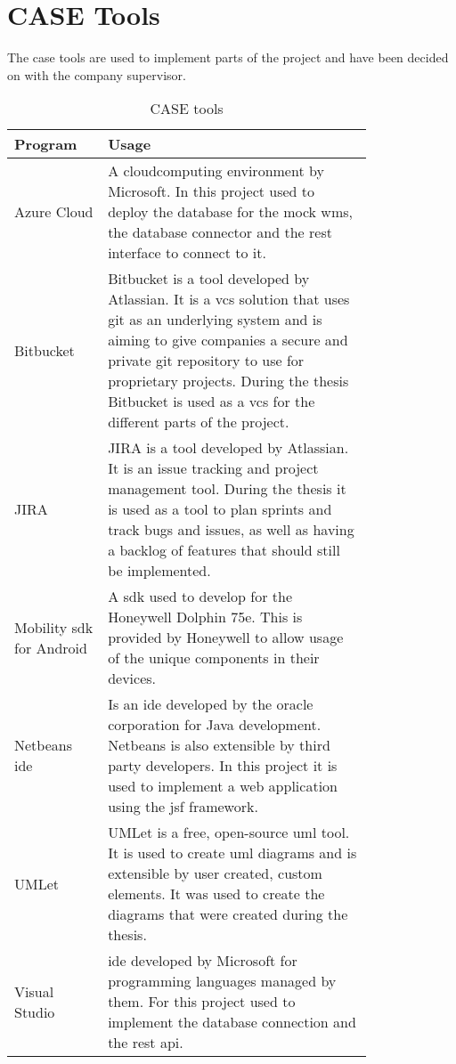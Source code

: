 \clearpage

\section{CASE Tools}\label{sec:caseTools}
The \gls{case} tools are used to implement parts of the project and have been decided on with the company supervisor. 

\begin{table}[htbp]
	\begin{center}
	\begin{tabular}{|p{0.2\linewidth}|p{0.6\linewidth}|} \hline
	\textbf{Program} & \textbf{Usage} \\ \hline
	Azure Cloud & A \gls{cloudcomputing} environment by Microsoft. In this project used to deploy the database for the mock \gls{wms}, the database connector and the \gls{rest} interface to connect to it. \\ \hline
	Bitbucket & Bitbucket is a tool developed by Atlassian. It is a \gls{vcs} solution that uses git as an underlying system and is aiming to give companies a secure and private git repository to use for proprietary projects. During the thesis Bitbucket is used as a \gls{vcs} for the different parts of the project. \\ \hline
	JIRA & JIRA is a tool developed by Atlassian. It is an issue tracking and project management tool. During the thesis it is used as a tool to plan sprints and track bugs and issues, as well as having a backlog of features that should still be implemented. \\ \hline
	Mobility \gls{sdk} for Android & A \gls{sdk} used to develop for the Honeywell Dolphin 75e. This is provided by Honeywell to allow usage of the unique components in their devices.\\ \hline
	Netbeans \gls{ide} & Is an \gls{ide} developed by the oracle corporation for Java development. Netbeans is also extensible by third party developers. In this project it is used to implement a web application using the \gls{jsf} framework.  \\ \hline
	UMLet & UMLet is a free, open-source \gls{uml} tool. It is used to create \gls{uml} diagrams and is extensible by user created, custom elements. \citep{website:umlet} It was used to create the diagrams that were created during the thesis.  \\ \hline
	Visual Studio & \gls{ide} developed by Microsoft for programming languages managed by them. For this project used to implement the database connection and the \gls{rest} \gls{api}. \\ \hline
	\end{tabular}
	\end{center}
	\caption{CASE tools}\label{tab:case}
\end{table}